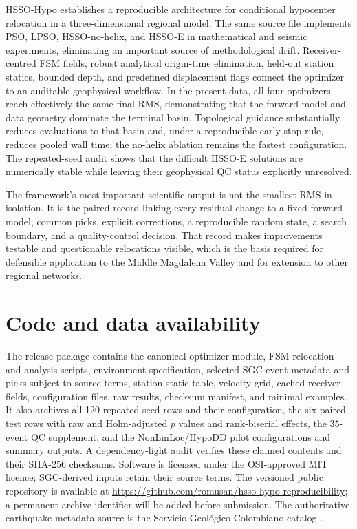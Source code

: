 \documentclass[10pt]{article}
\begin{document}
HSSO-Hypo establishes a reproducible architecture for conditional hypocenter relocation in a three-dimensional regional model. The same source file implements PSO, LPSO, HSSO-no-helix, and HSSO-E in mathematical and seismic experiments, eliminating an important source of methodological drift. Receiver-centred FSM fields, robust analytical origin-time elimination, held-out station statics, bounded depth, and predefined displacement flags connect the optimizer to an auditable geophysical workflow. In the present data, all four optimizers reach effectively the same final RMS, demonstrating that the forward model and data geometry dominate the terminal basin. Topological guidance substantially reduces evaluations to that basin and, under a reproducible early-stop rule, reduces pooled wall time; the no-helix ablation remains the fastest configuration. The repeated-seed audit shows that the difficult HSSO-E solutions are numerically stable while leaving their geophysical QC status explicitly unresolved.

The framework's most important scientific output is not the smallest RMS in isolation. It is the paired record linking every residual change to a fixed forward model, common picks, explicit corrections, a reproducible random state, a search boundary, and a quality-control decision. That record makes improvements testable and questionable relocations visible, which is the basis required for defensible application to the Middle Magdalena Valley and for extension to other regional networks.

\section*{Code and data availability}
The release package contains the canonical optimizer module, FSM relocation and analysis scripts, environment specification, selected SGC event metadata and picks subject to source terms, station-static table, velocity grid, cached receiver fields, configuration files, raw results, checksum manifest, and minimal examples. It also archives all 120 repeated-seed rows and their configuration, the six paired-test rows with raw and Holm-adjusted $p$ values and rank-biserial effects, the 35-event QC supplement, and the NonLinLoc/HypoDD pilot configurations and summary outputs. A dependency-light audit verifies these claimed contents and their SHA-256 checksums. Software is licensed under the OSI-approved MIT licence; SGC-derived inputs retain their source terms. The versioned public repository is available at \url{https://github.com/romusan/hsso-hypo-reproducibility}; a permanent archive identifier will be added before submission. The authoritative earthquake metadata source is the Servicio Geol\'ogico Colombiano catalog \citep{SGCCatalog}.
\end{document}
